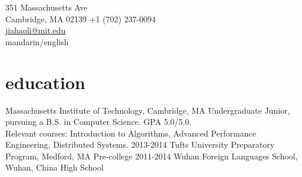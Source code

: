 \documentclass[]{friggeri-cv} %
\begin{document}
{351 Massachusetts Ave\\
Cambridge, MA 02139}
{+1 (702) 237-0094\\
\href{mailto:jiahaoli@mit.edu}{jiahaoli@mit.edu}\\
mandarin/english} %




\section{education}

\begin{entrylist}
  {Massachusetts Institute of Technology, Cambridge, MA}
  {Undergraduate}
  {Junior, pursuing a B.S. in Computer Science. GPA 5.0/5.0. \\
  Relevant courses: Introduction to Algorithms, Advanced Performance Engineering, Distributed Systems.}
  \sentry
  {2013-2014}
  {Tufts University Preparatory Program, Medford, MA}
  {Pre-college}
  \sentry
  {2011-2014}
  {Wuhan Foreign Languages School, Wuhan, China}
  {High School}
\end{entrylist}
\end{document}

